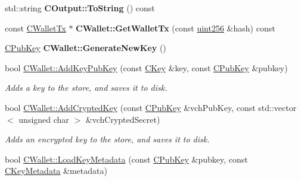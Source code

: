 \begin{DoxyCompactItemize}
\item 
\mbox{\label{group__map_wallet_gad80664c1a4a4cc36e8bd52077b1bd4db}} 
std\+::string {\bfseries C\+Output\+::\+To\+String} () const
\item 
\mbox{\label{group__map_wallet_gac496716bb889a5934fa27398aeb2330a}} 
const \mbox{\hyperlink{class_c_wallet_tx}{C\+Wallet\+Tx}} $\ast$ {\bfseries C\+Wallet\+::\+Get\+Wallet\+Tx} (const \mbox{\hyperlink{classuint256}{uint256}} \&hash) const
\item 
\mbox{\label{group__map_wallet_ga061fe7f54f80ec40f856b3e6365c2f4a}} 
\mbox{\hyperlink{class_c_pub_key}{C\+Pub\+Key}} {\bfseries C\+Wallet\+::\+Generate\+New\+Key} ()
\item 
\mbox{\label{group__map_wallet_ga3240da36cd717146296969227a3e0bd5}} 
bool \mbox{\hyperlink{group__map_wallet_ga3240da36cd717146296969227a3e0bd5}{C\+Wallet\+::\+Add\+Key\+Pub\+Key}} (const \mbox{\hyperlink{class_c_key}{C\+Key}} \&key, const \mbox{\hyperlink{class_c_pub_key}{C\+Pub\+Key}} \&pubkey)
\begin{DoxyCompactList}\small\item\em Adds a key to the store, and saves it to disk. \end{DoxyCompactList}\item 
\mbox{\label{group__map_wallet_ga3e90096a903d49cd751f05fcdb7692ce}} 
bool \mbox{\hyperlink{group__map_wallet_ga3e90096a903d49cd751f05fcdb7692ce}{C\+Wallet\+::\+Add\+Crypted\+Key}} (const \mbox{\hyperlink{class_c_pub_key}{C\+Pub\+Key}} \&vch\+Pub\+Key, const std\+::vector$<$ unsigned char $>$ \&vch\+Crypted\+Secret)
\begin{DoxyCompactList}\small\item\em Adds an encrypted key to the store, and saves it to disk. \end{DoxyCompactList}\item 
\mbox{\label{group__map_wallet_ga21e6580474514f838dfe1446890085a4}} 
bool \mbox{\hyperlink{group__map_wallet_ga21e6580474514f838dfe1446890085a4}{C\+Wallet\+::\+Load\+Key\+Metadata}} (const \mbox{\hyperlink{class_c_pub_key}{C\+Pub\+Key}} \&pubkey, const \mbox{\hyperlink{class_c_key_metadata}{C\+Key\+Metadata}} \&metadata)

\end{DoxyCompactItemize}
